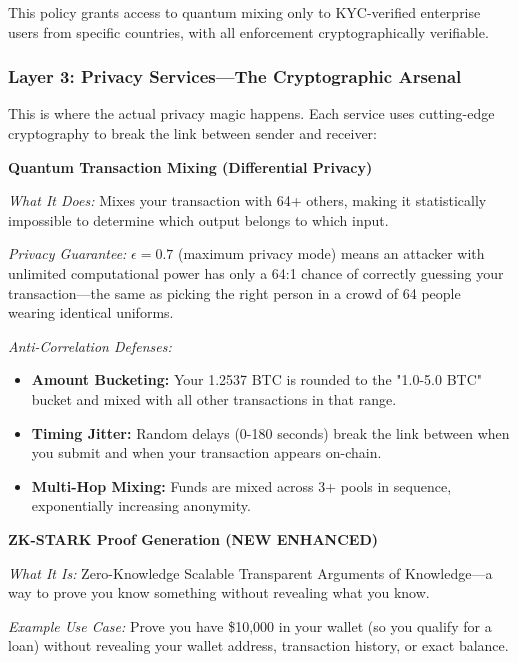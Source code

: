 \documentclass[11pt,a4paper]{article}
\begin{document}
This policy grants access to quantum mixing only to KYC-verified enterprise users from specific countries, with all enforcement cryptographically verifiable.

\subsubsection{Layer 3: Privacy Services—The Cryptographic Arsenal}

This is where the actual privacy magic happens. Each service uses cutting-edge cryptography to break the link between sender and receiver:

\textbf{Quantum Transaction Mixing (Differential Privacy)}

\textit{What It Does:} Mixes your transaction with 64+ others, making it statistically impossible to determine which output belongs to which input.

\textit{Privacy Guarantee:} $\epsilon = 0.7$ (maximum privacy mode) means an attacker with unlimited computational power has only a 64:1 chance of correctly guessing your transaction—the same as picking the right person in a crowd of 64 people wearing identical uniforms.

\textit{Anti-Correlation Defenses:}
\begin{itemize}
    \item \textbf{Amount Bucketing:} Your 1.2537 BTC is rounded to the "1.0-5.0 BTC" bucket and mixed with all other transactions in that range.

    \item \textbf{Timing Jitter:} Random delays (0-180 seconds) break the link between when you submit and when your transaction appears on-chain.

    \item \textbf{Multi-Hop Mixing:} Funds are mixed across 3+ pools in sequence, exponentially increasing anonymity.
\end{itemize}

\textbf{ZK-STARK Proof Generation (NEW ENHANCED)}

\textit{What It Is:} Zero-Knowledge Scalable Transparent Arguments of Knowledge—a way to prove you know something without revealing what you know.

\textit{Example Use Case:} Prove you have \$10,000 in your wallet (so you qualify for a loan) without revealing your wallet address, transaction history, or exact balance.
\end{document}

